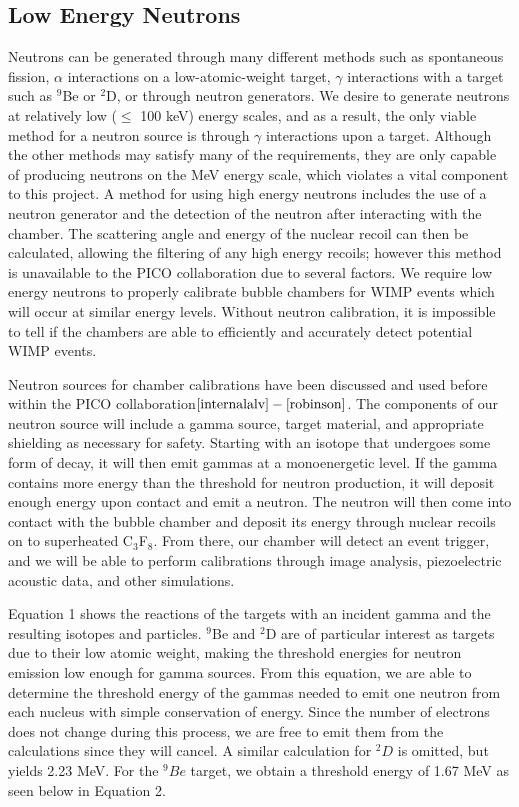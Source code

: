 \documentclass[%
12pt,
twoside,
reprint,
amsmath,amssymb,
aps,
]{article}
\begin{document}
	\subsection{Low Energy Neutrons}
	\par Neutrons can be generated through many different methods such as spontaneous fission, $\alpha$ interactions on a low-atomic-weight target, $\gamma$ interactions with a target such as $^{9}$Be or $^{2}$D, or through neutron generators. We desire to generate neutrons at relatively low ($\leq$ 100 keV) energy scales, and as a result, the only viable method for a neutron source is through $\gamma$ interactions upon a target. Although the other methods may satisfy many of the requirements, they are only capable of producing neutrons on the MeV energy scale, which violates a vital component to this project. A method for using high energy neutrons includes the use of a neutron generator and the detection of the neutron after interacting with the chamber. The scattering angle and energy of the nuclear recoil can then be calculated, allowing the filtering of any high energy recoils; however this method is unavailable to the PICO collaboration due to several factors. We require low energy neutrons to properly calibrate bubble chambers for WIMP events which will occur at similar energy levels. Without neutron calibration, it is impossible to tell if the chambers are able to efficiently and accurately detect potential WIMP events.
	\par Neutron sources for chamber calibrations have been discussed and used before within the PICO collaboration${\cite{internalalv}-\cite{robinson}}$. The components of our neutron source will include a gamma source, target material, and appropriate shielding as necessary for safety. Starting with an isotope that undergoes some form of decay, it will then emit gammas at a monoenergetic level. If the gamma contains more energy than the threshold for neutron production, it will deposit enough energy upon contact and emit a neutron. The neutron will then come into contact with the bubble chamber and deposit its energy through nuclear recoils on to superheated C$_{3}$F$_{8}$. From there, our chamber will detect an event trigger, and we will be able to perform calibrations through image analysis, piezoelectric acoustic data, and other simulations.
	\par Equation 1 shows the reactions of the targets with an incident gamma and the resulting isotopes and particles. $^{9}$Be and $^{2}$D are of particular interest as targets due to their low atomic weight, making the threshold energies for neutron emission low enough for gamma sources. From this equation, we are able to determine the threshold energy of the gammas needed to emit one neutron from each nucleus with simple conservation of energy. Since the number of electrons does not change during this process, we are free to emit them from the calculations since they will cancel. A similar calculation for $^{2}D$ is omitted, but yields 2.23 MeV. For the $^{9}Be$ target, we obtain a threshold energy of 1.67 MeV as seen below in Equation 2.
\end{document}
